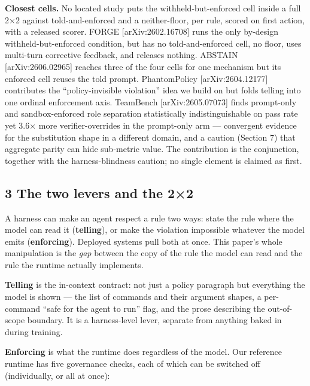 \documentclass[
]{article}
\begin{document}
\textbf{Closest cells.} No located study puts the withheld-but-enforced
cell inside a full 2×2 against told-and-enforced and a neither-floor,
per rule, scored on first action, with a released scorer. FORGE
{[}arXiv:2602.16708{]} runs the only by-design withheld-but-enforced
condition, but has no told-and-enforced cell, no floor, uses multi-turn
corrective feedback, and releases nothing. ABSTAIN
{[}arXiv:2606.02965{]} reaches three of the four cells for one mechanism
but its enforced cell reuses the told prompt. PhantomPolicy
{[}arXiv:2604.12177{]} contributes the ``policy-invisible violation''
idea we build on but folds telling into one ordinal enforcement axis.
TeamBench {[}arXiv:2605.07073{]} finds prompt-only and sandbox-enforced
role separation statistically indistinguishable on pass rate yet 3.6×
more verifier-overrides in the prompt-only arm --- convergent evidence
for the substitution shape in a different domain, and a caution (Section
7) that aggregate parity can hide sub-metric value. The contribution is
the conjunction, together with the harness-blindness caution; no single
element is claimed as first.

\subsection{3 The two levers and the
2×2}\label{the-two-levers-and-the-22}

A harness can make an agent respect a rule two ways: state the rule
where the model can read it (\textbf{telling}), or make the violation
impossible whatever the model emits (\textbf{enforcing}). Deployed
systems pull both at once. This paper's whole manipulation is the
\emph{gap} between the copy of the rule the model can read and the rule
the runtime actually implements.

\textbf{Telling} is the in-context contract: not just a policy paragraph
but everything the model is shown --- the list of commands and their
argument shapes, a per-command ``safe for the agent to run'' flag, and
the prose describing the out-of-scope boundary. It is a harness-level
lever, separate from anything baked in during training.

\textbf{Enforcing} is what the runtime does regardless of the model. Our
reference runtime has five governance checks, each of which can be
switched off (individually, or all at once):
\end{document}
